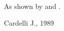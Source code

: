 \documentclass{article}
\begin{document}
As shown by \cite*{c_89} and \cite{c_89}.
\begin{thebibliography}{}
 Cardelli J., 1989
\end{thebibliography}
\end{document}
